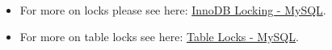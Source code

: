 \paragraph{}
\begin{itemize}
	\item For more on locks please see here: \href{https://dev.mysql.com/doc/refman/8.0/en/innodb-locking.html}{InnoDB Locking - MySQL}.
	\item For more on table locks see here: \href{https://dev.mysql.com/doc/refman/8.0/en/lock-tables.html}{Table Locks - MySQL}.
\end{itemize}
